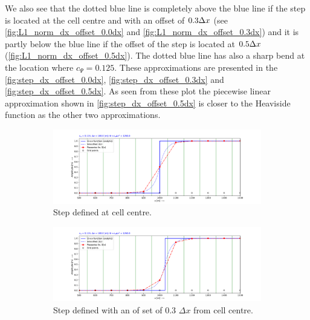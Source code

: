 We also see that the dotted blue line is completely above the blue line if the step is located at the cell centre and with an offset of $0.3\Delta x$ (see \autoref{fig:L1_norm_dx_offset_0.0dx} and \autoref{fig:L1_norm_dx_offset_0.3dx})
and it is partly below the blue line if the offset of the step is located at $0.5\Delta x$ (\autoref{fig:L1_norm_dx_offset_0.5dx}).
The dotted blue line has also a sharp bend at the location where $c_{\Psi}=0.125$. These approximations are presented in the \autoref{fig:step_dx_offset_0.0dx}, \autoref{fig:step_dx_offset_0.3dx} and \autoref{fig:step_dx_offset_0.5dx}.
As seen from these plot the piecewise linear approximation shown in   \autoref{fig:step_dx_offset_0.5dx} is closer to the Heaviside function as the other two approximations.
\begin{figure}[H]
\begin{subfigure}{0.5\textwidth}
    \includegraphics[width=\textwidth]{figures/regul_1d_step_at_0.00_function_dx100.0_cpsi0.125.pdf}
    \caption{Step defined at cell centre.\newline\phantom{text}\label{fig:step_dx_offset_0.0dx}}
\end{subfigure}
\begin{subfigure}{0.5\textwidth}
    \includegraphics[width=\textwidth]{figures/regul_1d_step_at_0.33_function_dx100.0_cpsi0.125.pdf}
    \caption{Step defined with an of set of  0.3 $\Delta x$ from cell centre.\label{fig:step_dx_offset_0.3dx}}
\end{subfigure}
\newline
\begin{subfigure}{0.5\textwidth}

\end{subfigure}
\end{figure}

